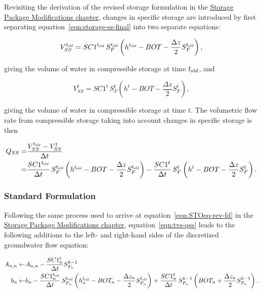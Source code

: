 Revisiting the derivation of the revised storage formulation in the \hyperref[ch:sto-mod]{Storage Package Modifications chapter}, changes in specific storage are introduced by first separating equation~\ref{eqn:storage-ss-final} into two separate equations:

\begin{equation}
	\label{eqn:tvs-vss-old}
	V_{SS}^{t_\mathit{\kern -0.07em old}} = SC1^{t_\mathit{\kern -0.07em old}} \, S_F^{t_\mathit{\kern -0.07em old}} \left( h^{t_\mathit{\kern -0.07em old}} - BOT - \frac{\Delta z}{2} S_F^{t_\mathit{\kern -0.07em old}} \right) ,
\end{equation}

\noindent giving the volume of water in compressible storage at time ${t_\mathit{\kern -0.07em old}}$, and

\begin{equation}
	\label{eqn:tvs-vss-new}
	V_{SS}^t = SC1^t \, S_F^t \left( h^t - BOT - \frac{\Delta z}{2} S_F^t \right) ,
\end{equation}

\noindent giving the volume of water in compressible storage at time $t$. The volumetric flow rate from compressible storage taking into account changes in specific storage is then

\begin{equation}
	\label{eqn:tvs-qss}
	\begin{aligned}
	Q_{SS} = & \frac{V_{SS}^{t_\mathit{\kern -0.07em old}} - V_{SS}^t}{\Delta t} \\
	       = & \frac{SC1^{t_\mathit{\kern -0.07em old}}}{\Delta t} \, S_F^{t_\mathit{\kern -0.07em old}} \left( h^{t_\mathit{\kern -0.07em old}} - BOT - \frac{\Delta z}{2} S_F^{t_\mathit{\kern -0.07em old}} \right) - \frac{SC1^t}{\Delta t} \, S_F^t \left( h^t - BOT - \frac{\Delta z}{2} S_F^t \right) .
	\end{aligned}
\end{equation}


\subsubsection{Standard Formulation}

Following the same process used to arrive at equation~\ref{eqn:STOeq-rev-fd} in the \hyperref[ch:sto-mod]{Storage Package Modifications chapter}, equation~\ref{eqn:tvs-qss} leads to the following additions to the left- and right-hand sides of the discretized groundwater flow equation:

\begin{equation}
	\label{eqn:tvs-Ab-std}
	\begin{aligned}
		A_{n,n} \leftarrow & A_{n,n} - \frac{SC1_n^t}{\Delta t} S_{F_n}^{k-1} \\
		b_n \leftarrow & b_n - \frac{SC1_n^{t_\mathit{\kern -0.07em old}}}{\Delta t} \, S_{F_n}^{t_\mathit{\kern -0.07em old}} \left( h_n^{t_\mathit{\kern -0.07em old}} - BOT_n - \frac{\Delta z_n}{2} S_{F_n}^{t_\mathit{\kern -0.07em old}} \right) + \frac{SC1_n^t}{\Delta t} \, S_{F_n}^{k-1} \left( BOT_n + \frac{\Delta z_n}{2} S_{F_n}^{k-1} \right) .
	\end{aligned}
\end{equation}

